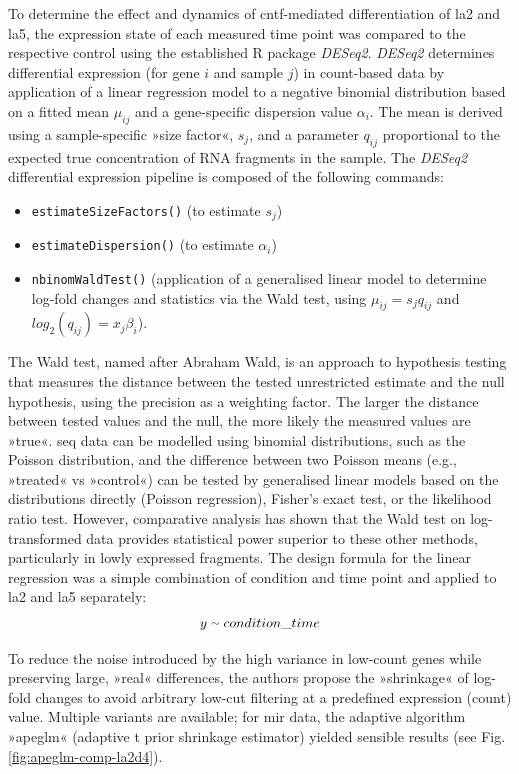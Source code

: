 \begin{method}
To determine the effect and dynamics of \ac{cntf}-mediated differentiation of \ac{la2} and \ac{la5}, the expression state of each measured time point was compared to the respective control using the established R package \textit{DESeq2}\cite{Love2014}. \textit{DESeq2} determines differential expression (for gene $i$ and sample $j$) in count-based data by application of a linear regression model to a negative binomial distribution based on a fitted mean $\mu_{ij}$ and a gene-specific dispersion value $\alpha_i$. The mean is derived using a sample-specific »size factor«, $s_j$, and a parameter $q_{ij}$ proportional to the expected true concentration of RNA fragments in the sample. The \textit{DESeq2} differential expression pipeline is composed of the following commands:
\begin{itemize}[noitemsep, leftmargin=.5cm, label={\tiny\raisebox{1ex}{\textbullet}}]
\item \texttt{estimateSizeFactors()} (to estimate $s_j$)
\item \texttt{estimateDispersion()} (to estimate $\alpha_i$)
\item \texttt{nbinomWaldTest()} (application of a generalised linear model to determine log-fold changes and statistics via the Wald test, using $\mu_{ij} = s_jq_{ij}$ and $log_2(q_{ij}) = x_j\beta_i$).
\end{itemize}
The Wald test, named after Abraham Wald\cite{Wald1939}, is an approach to hypothesis testing that measures the distance between the tested unrestricted estimate and the null hypothesis, using the precision as a weighting factor. The larger the distance between tested values and the null, the more likely the measured values are »true«. \ac{seq} data can be modelled using binomial distributions\cite{Bullard2010}, such as the Poisson distribution, and the difference between two Poisson means (e.g., »treated« vs »control«) can be tested by generalised linear models based on the distributions directly (Poisson regression), Fisher's exact test, or the likelihood ratio test. However, comparative analysis has shown that the Wald test on log-transformed data provides statistical power superior to these other methods\cite{Chen2011}, particularly in lowly expressed fragments. The design formula for the linear regression was a simple combination of condition and time point and applied to \ac{la2} and \ac{la5} separately: $$y \smallsim condition\_time$$

To reduce the noise introduced by the high variance in low-count genes while preserving large, »real« differences, the authors propose the »shrinkage« of log-fold changes to avoid arbitrary low-cut filtering at a predefined expression (count) value. Multiple variants are available; for \ac{mir} data, the adaptive algorithm »apeglm«\cite{Zhu2019} (adaptive t prior shrinkage estimator) yielded sensible results (see Fig.\,\ref{fig:apeglm-comp-la2d4}).

\end{method}

